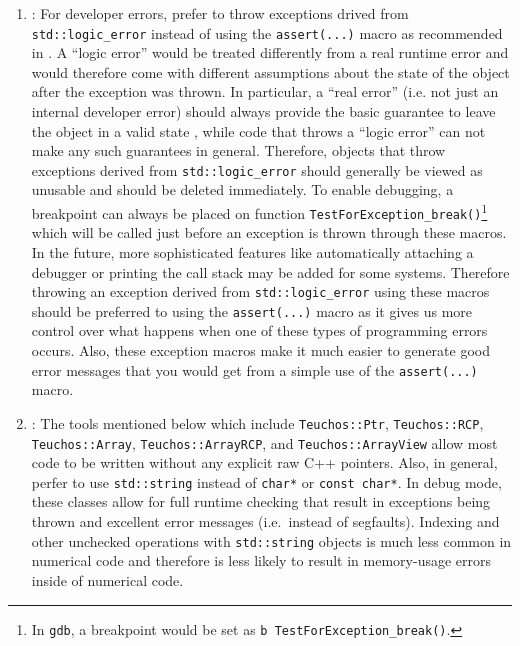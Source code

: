 \begin{enumerate}

{}\item\GCGTestForException: For developer errors, prefer to throw exceptions
drived from {}\texttt{std\-::logic\-\_error} instead of using the
{}\texttt{assert(...)}  macro as recommended in {}\cite[Item
68]{C++CodingStandards05}.  A ``logic error'' would be treated differently
from a real runtime error and would therefore come with different assumptions
about the state of the object after the exception was thrown.  In particular,
a ``real error'' (i.e. not just an internal developer error) should always
provide the basic guarantee to leave the object in a valid state {}\cite[Item
71]{C++CodingStandards05}, while code that throws a ``logic error'' can not
make any such guarantees in general.  Therefore, objects that throw exceptions
derived from {}\texttt{std\-::logic\-\_error} should generally be viewed as
unusable and should be deleted immediately.  To enable debugging, a breakpoint
can always be placed on function
{}\texttt{Test\-For\-Exception\-\_break()}\footnote{In {}\texttt{gdb}, a
breakpoint would be set as {}\texttt{b Test\-For\-Exception\-\_break()}.} 
which will be called just before an exception is thrown through these macros.
In the future, more sophisticated features like automatically attaching a
debugger or printing the call stack may be added for some systems.  Therefore
throwing an exception derived from {}\texttt{std\-::logic\-\_error} using
these macros should be preferred to using the {}\texttt{assert(...)} macro as
it gives us more control over what happens when one of these types of
programming errors occurs.  Also, these exception macros make it much easier
to generate good error messages that you would get from a simple use of the
{}\texttt{assert(...)} macro.

{}\item\GCGAvoidRawPointers: The tools mentioned below which include
{}\texttt{Teuchos::\-Ptr}, {}\texttt{Teuchos::\-RCP},
{}\texttt{Teuchos::\-Array}, {}\texttt{Teuchos::\-Array\-RCP}, and
{}\texttt{Teuchos::\-Array\-View} allow most code to be written without any
explicit raw C++ pointers.  Also, in general, perfer to use
{}\texttt{std\-::string} instead of {}\texttt{char*} or {}\texttt{const
char*}.  In debug mode, these classes allow for full runtime checking that
result in exceptions being thrown and excellent error messages (i.e.\ instead
of segfaults).  Indexing and other unchecked operations with
{}\texttt{std\-::string} objects is much less common in numerical code and
therefore is less likely to result in memory-usage errors inside of numerical
code.


\end{enumerate}
